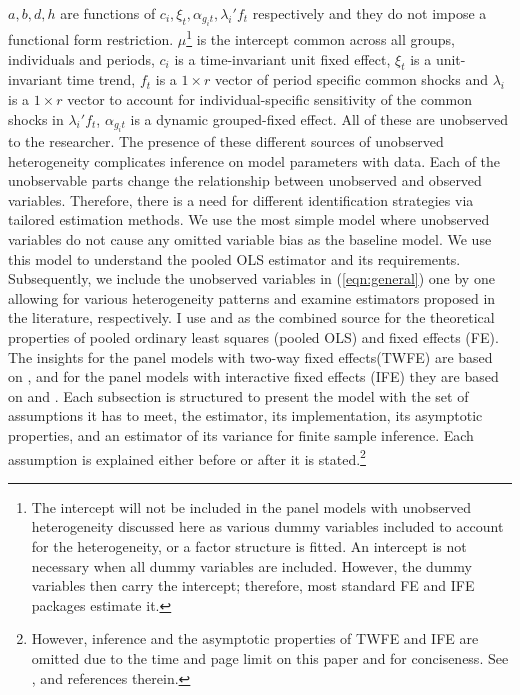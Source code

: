 $a, b, d, h$ are functions of $c_i, \xi_t, \alpha_{g_{i}t}, \lambda_i' f_t$ respectively and they do not impose a functional form restriction. %
$\mu$\footnote{The intercept will not be included in the panel models with unobserved heterogeneity discussed here as various dummy variables included to account for the heterogeneity, or a factor structure is fitted. An intercept is not necessary when all dummy variables are included. However, the dummy variables then carry the intercept; therefore, most standard FE and IFE packages estimate it.} is the intercept common across all groups, individuals and periods, $c_i$ is a time-invariant unit fixed effect, $ \xi_t$ is a unit-invariant time trend, $f_t$ is a $1\times r$ vector of period specific common shocks and $\lambda_i$ is a $1\times r$ vector to account for individual-specific sensitivity of the common shocks in $\lambda_i' f_t$, $\alpha_{g_{i}t}$ is a dynamic grouped-fixed effect. All of these are unobserved to the researcher. The presence of these different sources of unobserved heterogeneity complicates inference on model parameters with data. Each of the unobservable parts change the relationship between unobserved and observed variables. Therefore, there is a need for different identification strategies via tailored estimation methods.
We use the most simple model where unobserved variables do not cause any omitted variable bias as the baseline model. We use this model to understand the pooled OLS estimator and its requirements. Subsequently, we include the unobserved variables in (\ref{eqn:general}) one by one allowing for various heterogeneity patterns and examine estimators proposed in the literature, respectively.
I use \textcite{hansen2022econometrics} and \textcite{wooldridge2010econometric} as the combined source for the theoretical properties of pooled ordinary least squares (pooled OLS) and fixed effects (FE). The insights for the panel models with two-way fixed effects(TWFE) are based on \textcite{wooldridge2021two}, and for the panel models with interactive fixed effects (IFE) they are based on \textcite{bai2009panel} and \textcite{moon2015linear}. Each subsection is structured to present the model with the set of assumptions it has to meet, the estimator, its implementation, its asymptotic properties, and an estimator of its variance for finite sample inference. Each assumption is explained either before or after it is stated.\footnote{However, inference and the asymptotic properties of TWFE and IFE are omitted due to the time and page limit on this paper and for conciseness. See \textcite{wooldridge2021two}, \textcite{bai2009panel} and references therein.}  \\
